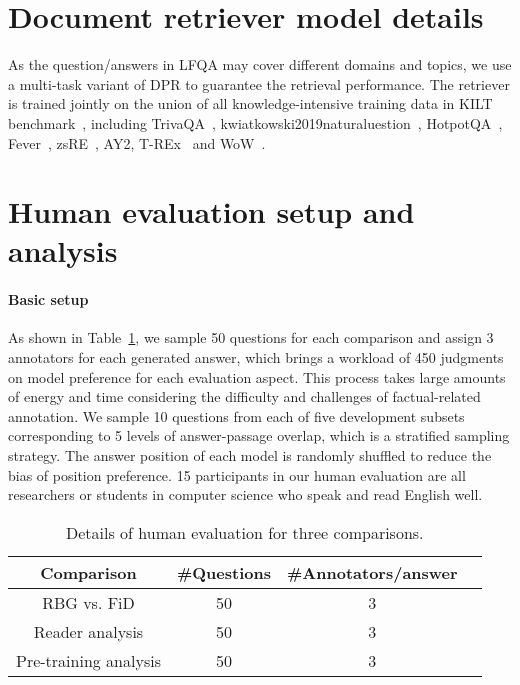 \documentclass[11pt]{article}
\begin{document}
\section{Document retriever model details}
As the question/answers in LFQA may cover different domains and topics, we use a multi-task variant of DPR to guarantee the retrieval performance. The retriever is trained jointly on the union of all knowledge-intensive training data in KILT benchmark~\cite{petroni2021kilt}, including TrivaQA~\cite{Joshi_2017}, kwiatkowski2019naturaluestion~\cite{kwiatkowski2019natural}, HotpotQA~\cite{yang2018HotpotQA}, Fever~\cite{thorne2018fever}, zsRE~\cite{levy2017zero}, AY2, T-REx~\cite{elsahar2018t} and WoW~\cite{dinan2018wizard}. 




\section{Human evaluation setup and analysis}
\label{appendix:human_eval}

\paragraph{Basic setup} As shown in Table~\ref{tab:human eval setup}, we sample 50 questions for each comparison and assign 3 annotators for each generated answer, which brings a workload of 450 judgments on model preference for each evaluation aspect. This process takes large amounts of energy and time considering the difficulty and challenges of factual-related annotation. We sample 10 questions from each of five development subsets corresponding to 5 levels of answer-passage overlap, which is a stratified sampling strategy. The answer position of each model is randomly shuffled to reduce the bias of position preference. 15 participants in our human evaluation are all researchers or students in computer science who speak and read English well.

\begin{table}[!ht]
\centering
\resizebox{0.45\textwidth}{!}
{
\begin{tabular}{c|ccc}
\hline
Comparison    & \#Questions & \#Annotators/answer  \\ \hline
RBG vs. FiD  &    50 &    3 \\
Reader analysis  &  50 &  3  \\
Pre-training analysis &  50 &  3 \\ \hline
\end{tabular}
}
\caption{Details of human evaluation for three comparisons.}
\label{tab:human eval setup}
\end{table}
\end{document}
